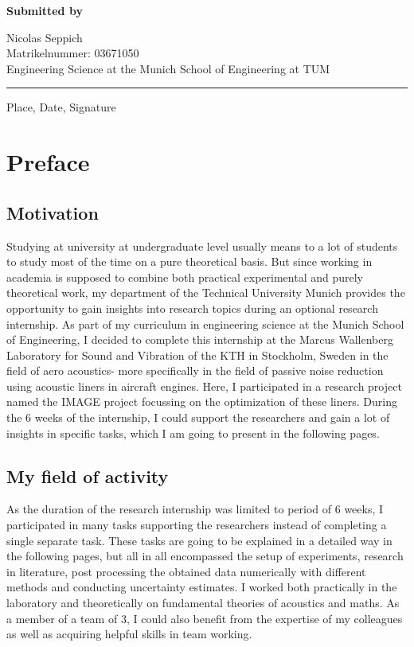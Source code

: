 \documentclass[11pt]{report} %
\newcommand{\EingereichtVon}{%
    Nicolas Seppich\\
    Matrikelnummer: 03671050\\
    Engineering Science at the Munich School of Engineering at TUM}
\newcommand{\Ort}{%
    Place}
\newcommand{\Datum}{%
    Date}
\begin{document}
\vspace*{6.3mm}
\textbf{Submitted by}\tab 
\begin{minipage}[t]{\textwidth-\CurrentLineWidth}
\EingereichtVon
\end{minipage}
\vspace*{-1mm}

\rule[-3.7mm]{\linewidth}{0.5pt}
\Ort{}, \Datum{}, Signature

\newpage
\tableofcontents
\newpage


\chapter{Preface}
\section{Motivation}
Studying at university at undergraduate level usually means to a lot of students to study most of the time on a pure theoretical basis.
But since working in academia is supposed to combine both practical experimental and purely theoretical work, my department of the Technical University Munich provides the opportunity to gain insights into research topics during an optional research internship.
As part of my curriculum in engineering science at the Munich School of Engineering, I decided to complete this internship at the Marcus Wallenberg Laboratory for Sound and Vibration of the KTH in Stockholm, Sweden in the field of aero acoustics-
more specifically in the field of passive noise reduction using acoustic liners in aircraft engines. Here, I participated in a research project named the IMAGE project focussing on the optimization of these liners. 
During the 6 weeks of the internship, I could support the researchers and gain a lot of insights in specific tasks, which I am going to present in the following pages. 

\section{My field of activity} 
As the duration of the research internship was limited to period of 6 weeks, I participated in many tasks supporting the researchers instead of completing a single separate task.
These tasks are going to be explained in a detailed way in the following pages, but all in all encompassed the setup of experiments, research in literature, post processing the obtained data numerically with different methods and conducting uncertainty estimates.
I worked both practically in the laboratory and theoretically on fundamental theories of acoustics and maths.
As a member of a team of 3, I could also benefit from the expertise of my colleagues as well as acquiring helpful skills in team working. 
\end{document}
